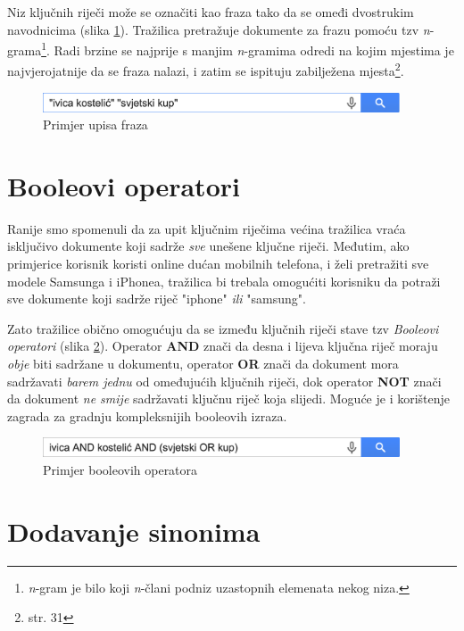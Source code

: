 \documentclass[a4paper,twoside,12pt]{memoir}
\begin{document}
Niz ključnih riječi može se označiti kao fraza tako da se omeđi dvostrukim navodnicima (slika \ref{phrases}). Tražilica pretražuje dokumente za frazu pomoću tzv \textit{n}-grama\footnote{\textit{n}-gram je bilo koji \textit{n}-člani podniz uzastopnih elemenata nekog niza.}. Radi brzine se najprije s manjim \textit{n}-gramima odredi na kojim mjestima je najvjerojatnije da se fraza nalazi, i zatim se ispituju zabilježena mjesta\footnote{\cite{taming} str. 31}.

\begin{figure}[H]
  \centering
  \includegraphics[width=300pt]{phrases}
  \caption{Primjer upisa fraza}
  \label{phrases}
\end{figure}

\section{Booleovi operatori}

Ranije smo spomenuli da za upit ključnim riječima većina tražilica vraća isključivo dokumente koji sadrže \textit{sve} unešene ključne riječi. Međutim, ako primjerice korisnik koristi online dućan mobilnih telefona, i želi pretražiti sve modele Samsunga i iPhonea, tražilica bi trebala omogućiti korisniku da potraži sve dokumente koji sadrže riječ "iphone" \textit{ili} "samsung".

Zato tražilice obično omogućuju da se između ključnih riječi stave tzv \textit{Booleovi operatori} (slika \ref{boolean}). Operator \textbf{AND} znači da desna i lijeva ključna riječ moraju \textit{obje} biti sadržane u dokumentu, operator \textbf{OR} znači da dokument mora sadržavati \textit{barem jednu} od omeđujućih ključnih riječi, dok operator \textbf{NOT} znači da dokument \textit{ne smije} sadržavati ključnu riječ koja slijedi. Moguće je i korištenje zagrada za gradnju kompleksnijih booleovih izraza.

\begin{figure}[H]
  \centering
  \includegraphics[width=300pt]{boolean}
  \caption{Primjer booleovih operatora}
  \label{boolean}
\end{figure}

\section{Dodavanje sinonima}
\end{document}
